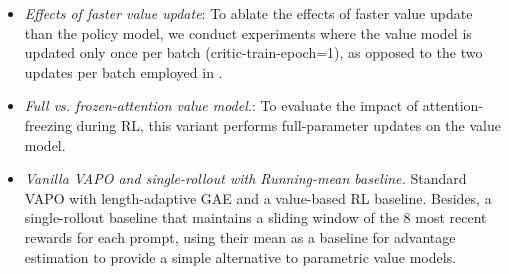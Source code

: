\begin{itemize}[leftmargin=*,itemsep=0pt,parsep=0.2em,topsep=0.3em,partopsep=0.3em]
\item \textit{Effects of faster value update}: To ablate the effects of faster value update than the policy model, we conduct experiments where the value model is updated only once per batch (critic-train-epoch=1), as opposed to the two updates per batch employed in \model. 
\item \textit{Full vs. frozen-attention value model.}: To evaluate the impact of attention-freezing during RL, this variant performs full-parameter updates on the value model. 

\item \textit{Vanilla VAPO and single-rollout with Running-mean baseline.} Standard VAPO\citep{yue2025vapo} with length-adaptive GAE and a value-based RL baseline. Besides, a single-rollout baseline that maintains a sliding window of the 8 most recent rewards for each prompt, using their mean as a baseline for advantage estimation to provide a simple alternative to parametric value models.

\end{itemize}


